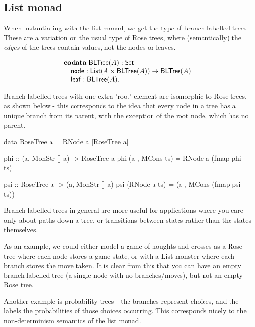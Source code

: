 \documentclass{article}
\begin{document}
\begin{haskell}
	
\end{haskell}

\subsection{List monad}

When instantiating with the list monad, we get the type of branch-labelled trees. These are a variation on the usual type of Rose trees, where (semantically) the \emph{edges} of the trees contain values, not the nodes or leaves.

$$
\begin{array}[t]{l}
\mathbf{codata}\;
\mathsf{BLTree}(A):\mathsf{Set}\\
\quad \mathsf{node} : \mathsf{List}(A \times \mathsf{BLTree}(A)) \rightarrow \mathsf{BLTree}(A)\\
\quad \mathsf{leaf} : \mathsf{BLTree}(A).
\end{array}
$$

Branch-labelled trees with one extra 'root' element are isomorphic to Rose trees, as shown below - this corresponds to the idea that every node in a tree has a unique branch from its parent, with the exception of the root node, which has no parent.

\begin{haskell}
data RoseTree a = RNode a [RoseTree a]

phi :: (a, MonStr [] a) -> RoseTree a
phi (a , MCons ts) = RNode a (fmap phi ts)

psi :: RoseTree a -> (a, MonStr [] a)
psi (RNode a ts) = (a , MCons (fmap psi ts))
\end{haskell}

Branch-labelled trees in general are more useful for applications where you care only about paths down a tree, or transitions between states rather than the states themselves. 

As an example, we could either model a game of noughts and crosses as a Rose tree where each node stores a game state, or with a List-monster where each branch stores the move taken. It is clear from this that you can have an empty branch-labelled tree (a single node with no branches/moves), but not an empty Rose tree.

Another example is probability trees - the branches represent choices, and the labels the probabilities of those choices occurring. This corresponds nicely to the non-determinism semantics of the list monad.\\
\end{document}
